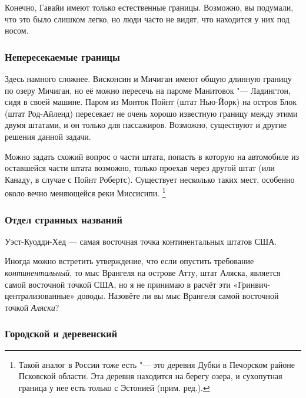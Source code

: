 \documentclass[twoside]{book}
\begin{document}
Конечно, Гавайи имеют только естественные границы.
Возможно, вы подумали, что это было слишком легко, но люди часто не видят, что находится у них под носом.
\heart

\subsubsection*{Непересекаемые границы}%

Здесь намного сложнее.
Висконсин и Мичиган имеют общую длинную границу по озеру Мичиган, но её можно пересечь на пароме Манитовок "--- Ладингтон, сидя в своей машине.
Паром из Монток Пойнт %
(штат Нью-Йорк) на остров Блок %
(штат Род-Айленд) пересекает не очень хорошо известную границу между этими двумя штатами, и он только для пассажиров.
Возможно, существуют и другие решения данной задачи.\heart
                             

Можно задать схожий вопрос о части штата, попасть в которую на автомобиле из оставшейся части штата возможно, только проехав через другой штат (или Канаду, в случае с 
Пойнт Робертс). %
Существует несколько таких мест, особенно около вечно меняющейся реки Миссисипи.%
\footnote{Такой аналог в России тоже есть "--- это деревня Дубки в Печорском  районе Псковской области.
Эта деревня находится на берегу озера, и сухопутная граница у нее есть только с Эстонией (прим. ред.).}

\subsubsection*{Отдел странных названий}%

Уэст-Куодди-Хед %
--- самая восточная точка континентальных штатов США.\heart
                            

Иногда можно встретить утверждение, что если опустить требование \emph{континентальный}, то мыс Врангеля %
на острове Атту, %
штат Аляска, является самой восточной точкой США, но я не принимаю в расчёт эти «Гринвич-централизованные» доводы.
Назовёте ли вы мыс Врангеля самой восточной точкой \emph{Аляски}?

\subsubsection*{Городской и деревенский}%
\end{document}
